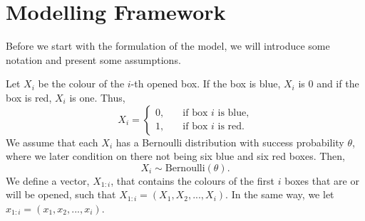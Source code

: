 \section{Modelling Framework}
\label{section_notation}
Before we start with the formulation of the model, we will introduce some notation and present some assumptions. 

Let $X_i$ be the colour of the $i$-th opened box. If the box is blue, $X_i$ is 0 and if the box is red, $X_i$ is one. Thus,
\begin{equation*}
    X_i = \begin{cases}
    0,& \quad \text{if box } i \text{ is blue,}\\
    1,& \quad \text{if box } i \text{ is red.}
    \end{cases}
\end{equation*}
We assume that each $X_i$ has a Bernoulli distribution with success probability $\theta$, where we later condition on there not being six blue and six red boxes. Then,
\begin{equation*}
    X_i \sim \text{Bernoulli}(\theta).
\end{equation*}
We define a vector, $X_{1:i}$, that contains the colours of the first $i$ boxes that are or will be opened, such that $X_{1:i} = (X_1,X_2,...,X_{i})$. In the same way, we let $x_{1:i} = (x_1,x_2,...,x_{i})$.

